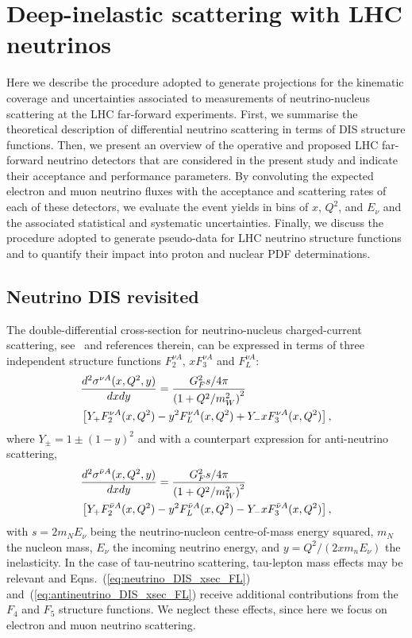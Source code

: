 \section{Deep-inelastic scattering with LHC neutrinos}
\label{sec:dis_pseudodata}

Here we describe the procedure adopted 
to generate projections for the kinematic coverage
and uncertainties associated to  measurements
of neutrino-nucleus scattering at the LHC far-forward experiments.
%
First, we summarise the theoretical description of differential
neutrino scattering in terms of DIS structure functions.
%
Then, we present an  overview of the operative and proposed
LHC far-forward neutrino detectors that
are considered in the present study and indicate their
acceptance and performance parameters.
%
By convoluting the expected electron and muon neutrino fluxes
with the acceptance and scattering rates of each
of these detectors,
we evaluate the event yields in bins of $x$, $Q^2$,
and $E_\nu$ and the associated statistical and systematic uncertainties.
%
Finally, we discuss the procedure adopted to generate pseudo-data
for LHC neutrino structure functions
and to quantify their impact
 into proton and nuclear PDF determinations.

 \subsection{Neutrino DIS revisited}
 \label{sec:nudis_revisited}

The double-differential cross-section for neutrino-nucleus charged-current scattering,
see~\cite{Candido:2023utz} and references therein,
can be expressed in terms of three
independent structure functions $F_2^{\nu A}$, $xF_3^{\nu A}$
and $F_L^{\nu A}$:
\begin{align}
	\label{eq:neutrino_DIS_xsec_FL}
	&{{d^2\sigma^{\nu A}(x,Q^2,y)}\over {dxdy}} =  {{G_F^2s/4\pi}\over {\left(1+Q^2/m_W^2\right)^2}}\\ 
	& \left[ Y_+F^{\nu A}_2(x,Q^2) - y^2F^{\nu A}_L(x,Q^2) +Y_- xF^{\nu A}_3(x,Q^2)\right], \nonumber
\end{align}
where $Y_\pm = 1 \pm (1-y)^2$ and with a counterpart expression for anti-neutrino scattering,
\begin{align}
	\label{eq:antineutrino_DIS_xsec_FL}
	&{{d^2\sigma^{\bar{\nu} A}(x,Q^2,y)}\over {dxdy}} =  {{G_F^2s/4\pi}\over {\left(1+Q^2/m_W^2\right)^2}} \\
	& \left[ Y_+F^{\bar{\nu} A}_2(x,Q^2) - y^2F^{\bar{\nu} A}_L(x,Q^2) -Y_- xF^{\bar{\nu} A}_3(x,Q^2)\right],
	\nonumber
\end{align}
with $s=2m_N E_\nu$ being the neutrino-nucleon centre-of-mass energy squared, $m_N$ the nucleon mass,
$E_\nu$ the incoming neutrino energy,
and $y=Q^2/(2x m_n E_{\nu})$ the inelasticity.
%
In the case of tau-neutrino scattering, tau-lepton mass effects
may be relevant and Eqns.~(\ref{eq:neutrino_DIS_xsec_FL}) and~(\ref{eq:antineutrino_DIS_xsec_FL}) receive additional contributions
from the $F_4$ and $F_5$ structure functions.
%
We neglect these effects, since here we focus on electron and muon neutrino scattering.

